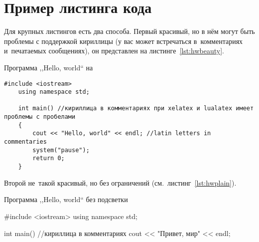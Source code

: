 \chapter{Пример листинга кода}\label{app:C}
Для крупных листингов есть два способа. Первый красивый, но в нём могут быть
проблемы с поддержкой кириллицы (у вас может встречаться в~комментариях
и~печатаемых сообщениях), он представлен на листинге~\cref{lst:hwbeauty}.
\begin{ListingEnv}[!h]%
    \captiondelim{ } %
    \caption{Программа ,,Hello, world`` на \protect\cpp}\label{lst:hwbeauty}
    \begin{lstlisting}[language={[ISO]C++}]
	#include <iostream>
	using namespace std;

	int main() //кириллица в комментариях при xelatex и lualatex имеет проблемы с пробелами
	{
		cout << "Hello, world" << endl; //latin letters in commentaries
		system("pause");
		return 0;
	}
    \end{lstlisting}
\end{ListingEnv}%
Второй не~такой красивый, но без ограничений (см.~листинг~\cref{lst:hwplain}).
\begin{ListingEnv}[!h]
    \captiondelim{ } %
    \caption{Программа ,,Hello, world`` без подсветки}\label{lst:hwplain}
    \begin{Verb}

        #include <iostream>
        using namespace std;

        int main() //кириллица в комментариях
        {
            cout << "Привет, мир" << endl;
        }
    \end{Verb}
\end{ListingEnv}



\clearpage
{}